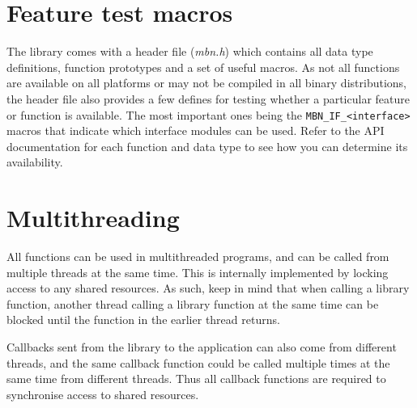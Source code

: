 \section{Feature test macros}
The library comes with a header file (\textit{mbn.h}) which contains all data type definitions, function prototypes and a set of useful macros. As not all functions are available on all platforms or may not be compiled in all binary distributions, the header file also provides a few defines for testing whether a particular feature or function is available. The most important ones being the \verb|MBN_IF_<interface>| macros that indicate which interface modules can be used. Refer to the API documentation for each function and data type to see how you can determine its availability.


\section{Multithreading}
All functions can be used in multithreaded programs, and can be called from multiple threads at the same time. This is internally implemented by locking access to any shared resources. As such, keep in mind that when calling a library function, another thread calling a library function at the same time can be blocked until the function in the earlier thread returns.

Callbacks sent from the library to the application can also come from  different threads, and the same callback function could be called multiple times at the same time from different threads. Thus all callback functions are required to synchronise access to shared resources.